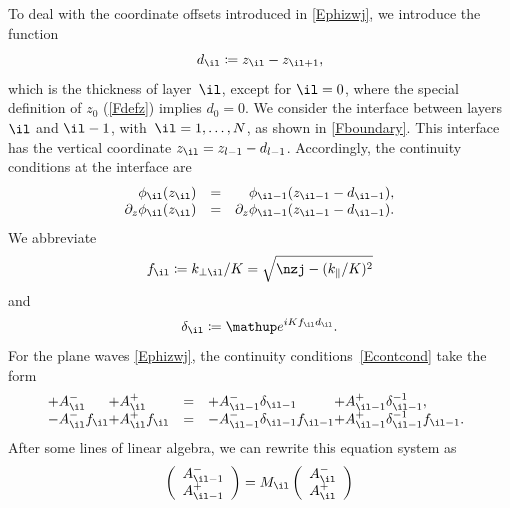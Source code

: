 To deal with the coordinate offsets introduced in \cref{Ephizwj},
we introduce the function%
\begin{equation}\label{Edldef}
  d_\il\coloneqq z_{\il}-z_{\il+1},
\end{equation}
which is the thickness of layer~$\il$,
except for $\il=0$,
where the special definition of $z_0$ (\cref{Fdefz}) implies $d_0=0$.
We consider the interface between layers $\il$ and $\il-1$,
with~$\il=1,\ldots,N$, as shown in \cref{Fboundary}.
This interface has the vertical coordinate $z_{\il}=z_{l-1}-d_{l-1}$.
Accordingly, the continuity conditions at the interface are
\begin{equation}\label{Econtcond}
  \begin{array}{lcl}
 \hphantom{\partial_z}\phi_{\il}(z_{\il}) &=& \hphantom{\partial_z}\phi_{\il-1}(z_{\il-1}-d_{\il-1}),\\
           \partial_z \phi_{\il}(z_{\il}) &=&           \partial_z \phi_{\il-1}(z_{\il-1}-d_{\il-1}).
  \end{array}
\end{equation}
We abbreviate
\begin{equation}\label{Efldef}
  f_\il \coloneqq  k_{\perp \il}/K = \sqrt{\nzj-(k_\plll/K)^2}
\end{equation}
and
\begin{equation}\label{Edelldef}
   \delta_\il \coloneqq  \e^{iKf_\il d_\il}.
\end{equation}
For the plane waves \cref{Ephizwj},
the continuity conditions~\cref{Econtcond} take the form
\begin{equation}\label{Econt2}
  \begin{array}{@{}l@{}lcl@{}l}
  +A^-_{\il} &+A^+_{\il}
  &=&
  +A^-_{\il-1}\delta_{\il-1} &+A^+_{\il-1}\delta_{\il-1}^{-1},
  \\
  -A^-_{\il} f_{\il}  &+A^+_{\il} f_{\il}
  &=&
  -A^-_{\il-1}\delta_{\il-1} f_{\il-1} &+A^+_{\il-1}\delta_{\il-1}^{-1} f_{\il-1}.
  \end{array}
\end{equation}
After some lines of linear algebra,
we can rewrite this equation system as
\begin{equation}\label{EcMc}
  \left( \begin{array}{c}A^-_{\il-1}\\ A^+_{\il-1}\end{array} \right)
  = M_{\il} \left( \begin{array}{c}A^-_{\il}\\A^+_{\il}\end{array} \right)
\end{equation}
